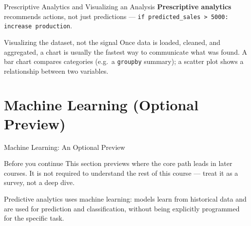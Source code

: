 \documentclass[9pt,aspectratio=169,xcolor=table]{beamer}
\begin{document}
\begin{frame}{Prescriptive Analytics and Visualizing an Analysis}
    \leavevmode
    \small
    \textbf{Prescriptive analytics} recommends actions, not just
    predictions --- \texttt{if predicted\_sales > 5000: increase
    production}.

    \vspace{3mm}
    \begin{block}{Visualizing the dataset, not the signal}
        Once data is loaded, cleaned, and aggregated, a chart is usually
        the fastest way to communicate what was found. A \alert{bar
        chart} compares categories (e.g.\ a \texttt{groupby} summary); a
        \alert{scatter plot} shows a relationship between two variables.
    \end{block}
\end{frame}

\section{Machine Learning (Optional Preview)}

\begin{frame}{Machine Learning: An Optional Preview}
    \leavevmode
    \begin{alertblock}{Before you continue}
        This section previews where the core path leads in later
        courses. It is \alert{not required} to understand the rest of
        this course --- treat it as a survey, not a deep dive.
    \end{alertblock}

    \vspace{3mm}
    Predictive analytics uses machine learning: models learn from
    historical data and are used for prediction and classification,
    without being explicitly programmed for the specific task.
\end{frame}
\end{document}
